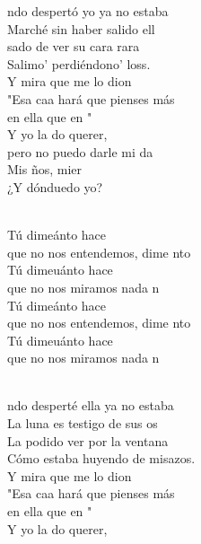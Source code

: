 \begin{cancion}%
	ndo despertó yo ya no estaba\\
	Marché sin haber salido ell\\
	sado de ver su cara rara\\
	Salimo' perdiéndono' loss.\\
	Y mira que me lo dion\\
	"Esa caa hará que pienses más \\
	en ella que en "\\
	Y yo la do querer, \\
	pero no puedo darle mi da\\
	Mis ños, mier\\
	¿Y dónduedo yo?\\\jump\\
	\begin{chorus}%
	Tú dimeánto hace \\
	que no nos entendemos, dime nto \\
	Tú dimeuánto hace  \\
	que no nos miramos nada n\\
	Tú dimeánto hace  \\
	que no nos entendemos, dime nto \\
	Tú dimeuánto hace  \\
	que no nos miramos nada n\\
	\end{chorus}%
	\jump\\
	ndo desperté ella ya no estaba\\
	La luna es testigo de sus os\\
	La podido ver por la ventana\\
	Cómo estaba huyendo de misazos.\\
	Y mira que me lo dion\\
	"Esa caa hará que pienses más \\
	en ella que en "\\
	Y yo la do querer, \\

\end{cancion}
